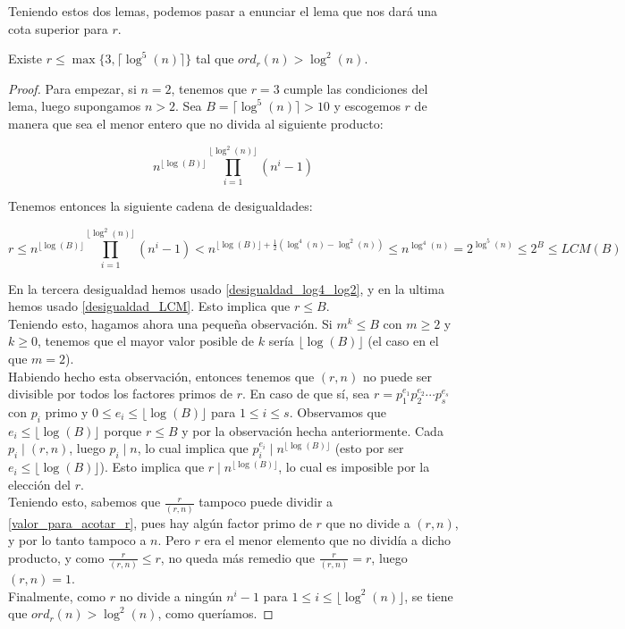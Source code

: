 Teniendo estos dos lemas, podemos pasar a enunciar el lema que nos dará una cota superior para $r$.

\begin{lema}\label{cota_superior_r_log5}
	Existe $r \leq \max\{3, \lceil \log^5(n) \rceil \}$ tal que $ord_r(n) > \log^2(n)$.
\end{lema}

\begin{proof}
	Para empezar, si $n = 2$, tenemos que $r = 3$ cumple las condiciones del lema, luego supongamos $n > 2$. Sea $B = \lceil \log^5(n) \rceil > 10$ y escogemos $r$ de manera que sea el menor entero que no divida al siguiente producto:
		
	\begin{equation}\label{valor_para_acotar_r}
	n^{\lfloor \log(B) \rfloor}\prod_{i=1}^{\lfloor \log^2(n) \rfloor}(n^i - 1)
	\end{equation}
	
	Tenemos entonces la siguiente cadena de desigualdades:
	
	\[ r \leq n^{\lfloor \log(B) \rfloor}\prod_{i=1}^{\lfloor \log^2(n) \rfloor}(n^i - 1) < n^{\lfloor \log(B) \rfloor + \frac{1}{2}(\log^4(n) - \log^2(n))} \leq n^{\log^4(n)} = 2^{\log^5(n)} \leq 2^B \leq LCM(B) \]
	
	En la tercera desigualdad hemos usado \autoref{desigualdad_log4_log2}, y en la ultima hemos usado \autoref{desigualdad_LCM}. Esto implica que $r \leq B$.\\
	
	Teniendo esto, hagamos ahora una pequeña observación. Si $m^k \leq B$ con $m \geq 2$ y $k \geq 0$, tenemos que el mayor valor posible de $k$ sería $\lfloor \log(B) \rfloor$ (el caso en el que $m = 2$).\\
	
	Habiendo hecho esta observación, entonces tenemos que $(r, n)$ no puede ser divisible por todos los factores primos de $r$. En caso de que sí, sea $r = p_1^{e_1}p_2^{e_2}\dotsm p_s^{e_s}$ con $p_i$ primo y $0 \leq e_i \leq \lfloor \log(B) \rfloor$ para $1 \leq i \leq s$. Observamos que $e_i \leq \lfloor \log(B) \rfloor$ porque $r \leq B$ y por la observación hecha anteriormente. Cada $p_i \mid (r, n)$, luego $p_i \mid n$, lo cual implica que $p_i^{e_i} \mid n^{\lfloor \log(B) \rfloor}$ (esto por ser $e_i \leq \lfloor \log(B) \rfloor$). Esto implica que $r \mid n^{\lfloor \log(B) \rfloor}$, lo cual es imposible por la elección del $r$.\\
	
	Teniendo esto, sabemos que $\frac{r}{(r, n)}$ tampoco puede dividir a \eqref{valor_para_acotar_r}, pues hay algún factor primo de $r$ que no divide a $(r, n)$, y por lo tanto tampoco a $n$. Pero $r$ era el menor elemento que no dividía a dicho producto, y como $\frac{r}{(r, n)} \leq r$, no queda más remedio que $\frac{r}{(r, n)} = r$, luego $(r, n) = 1$.\\
	
	Finalmente, como $r$ no divide a ningún $n^i - 1$ para $1 \leq i \leq \lfloor \log^2(n) \rfloor$, se tiene que $ord_r(n) > \log^2(n)$, como queríamos.
\end{proof}

